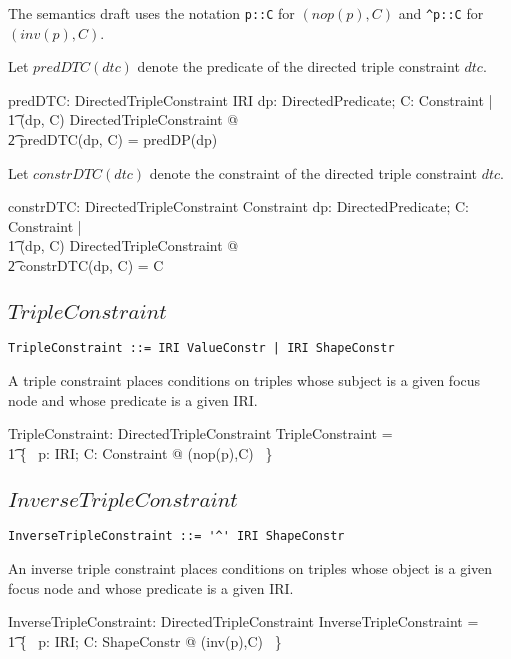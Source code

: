 \documentclass{article}
\begin{document}
The semantics draft uses the notation {\tt p::C} for $(nop(p),C)$ and {\tt \verb+^+p::C} for $(inv(p),C)$.

Let $predDTC(dtc)$ denote the predicate of the directed triple constraint $dtc$.
\begin{axdef}
	predDTC: DirectedTripleConstraint \fun IRI
\where
	\forall dp: DirectedPredicate; C: Constraint | \\
\t1		(dp, C) \in DirectedTripleConstraint @ \\
\t2			predDTC(dp, C) = predDP(dp)
\end{axdef}

Let $constrDTC(dtc)$ denote the constraint of the directed triple constraint $dtc$.
\begin{axdef}
	constrDTC: DirectedTripleConstraint \fun Constraint
\where
	\forall dp: DirectedPredicate; C: Constraint | \\
\t1		(dp, C) \in DirectedTripleConstraint @ \\
\t2			constrDTC(dp, C) = C
\end{axdef}

\subsection{$TripleConstraint$}

\begin{verbatim}
TripleConstraint ::= IRI ValueConstr | IRI ShapeConstr
\end{verbatim}

A triple constraint places conditions on triples whose subject is a given focus node
and whose predicate is a given IRI.
\begin{axdef}
	TripleConstraint: \power DirectedTripleConstraint
\where
	TripleConstraint = \\
\t1		\{~ p: IRI; C: Constraint @ (nop(p),C) ~\}
\end{axdef}

\subsection{$InverseTripleConstraint$}

\begin{verbatim}
InverseTripleConstraint ::= '^' IRI ShapeConstr
\end{verbatim}

An inverse triple constraint places conditions on triples whose object is a given focus node
and whose predicate is a given IRI.
\begin{axdef}
	InverseTripleConstraint: \power DirectedTripleConstraint
\where
	InverseTripleConstraint = \\
\t1		\{~ p: IRI; C: ShapeConstr @ (inv(p),C) ~\}
\end{axdef}
\end{document}
